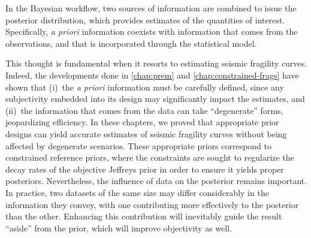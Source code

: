 In the Bayesian workflow, two sources of information are combined to issue the posterior distribution, which provides estimates of the quantities of interest. 
Specifically, \emph{a priori} information  coexists with information that comes from the observations, and that is incorporated through the statistical model.

This thought is fundamental %
when it resorts to estimating seismic fragility curves.
Indeed, the developments done in \cref{chap:prem} and \cref{chap:constrained-frags}
have shown that (i)~the \emph{a priori} information  must be carefully defined, since any  subjectivity embedded into its design may significantly impact the estimates, and (ii)~the information that comes from the data can take ``degenerate'' forms, jeopardizing efficiency.
In these chapters, we proved that appropriate prior designs can yield accurate estimates of seismic fragility curves
without being affected by degenerate scenarios. These appropriate priors 
correspond to constrained reference priors, where the constraints are sought to regularize the decay rates of the objective Jeffreys prior in order to ensure it yields proper posteriors.
Nevertheless, the influence of data on the posterior remains important. %
In practice, %
two datasets of the same size may differ considerably in the information they convey, with one contributing more effectively to the posterior than the other. Enhancing this contribution will inevitably guide the result ``aside'' from the prior, which will improve objectivity as well.


